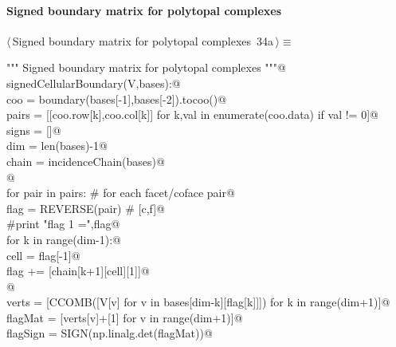 \documentclass[11pt,oneside]{article}	%
\begin{document}

\paragraph{Signed boundary matrix for polytopal complexes}

\begin{flushleft} \small \label{scrap54}
\protect{}$\langle\,$Signed boundary matrix for polytopal complexes\nobreak\ {\footnotesize 34a}$\,\rangle\equiv$
\vspace{-1ex}
\begin{list}{}{} \item
\mbox{}\verb@""" Signed boundary matrix for polytopal complexes """@\\
\mbox{}\verb@def signedCellularBoundary(V,bases):@\\
\mbox{}\verb@   coo = boundary(bases[-1],bases[-2]).tocoo()@\\
\mbox{}\verb@   pairs = [[coo.row[k],coo.col[k]] for k,val in enumerate(coo.data) if val != 0]@\\
\mbox{}\verb@   signs = []@\\
\mbox{}\verb@   dim = len(bases)-1@\\
\mbox{}\verb@   chain = incidenceChain(bases)@\\
\mbox{}\verb@   @\\
\mbox{}\verb@   for pair in pairs:      # for each facet/coface pair@\\
\mbox{}\verb@      flag = REVERSE(pair) #  [c,f]@\\
\mbox{}\verb@      #print "flag 1 =",flag@\\
\mbox{}\verb@      for k in range(dim-1):@\\
\mbox{}\verb@         cell = flag[-1]@\\
\mbox{}\verb@         flag += [chain[k+1][cell][1]]@\\
\mbox{}\verb@      @\\
\mbox{}\verb@      verts = [CCOMB([V[v] for v in bases[dim-k][flag[k]]]) for k in range(dim+1)]@\\
\mbox{}\verb@      flagMat = [verts[v]+[1] for v in range(dim+1)]@\\
\mbox{}\verb@      flagSign = SIGN(np.linalg.det(flagMat))@\\

\end{list}
\end{flushleft}
\end{document}

